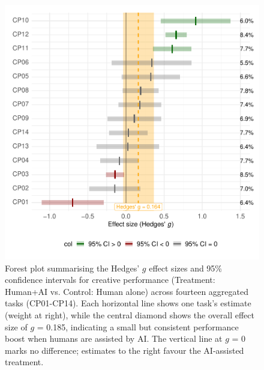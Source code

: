 \documentclass[manuscript, screen, review, acmsmall, anonymous]{acmart}
\begin{document}
\begin{figure}[H]
  \centering
  \includegraphics[width=\linewidth]{plot_performance_agg_forest}
  \caption{Forest plot summarising the Hedges’ $g$ effect sizes and 95\% confidence intervals for creative performance (Treatment: Human+AI vs. Control: Human alone) across fourteen aggregated tasks (CP01-CP14). Each horizontal line shows one task’s estimate (weight at right), while the central diamond shows the overall effect size of $g$ = 0.185, indicating a small but consistent performance boost when humans are assisted by AI. The vertical line at $g$ = 0 marks no difference; estimates to the right favour the AI‑assisted treatment.}
  \label{fig:performance_agg_forest}
\end{figure}
\end{document}
